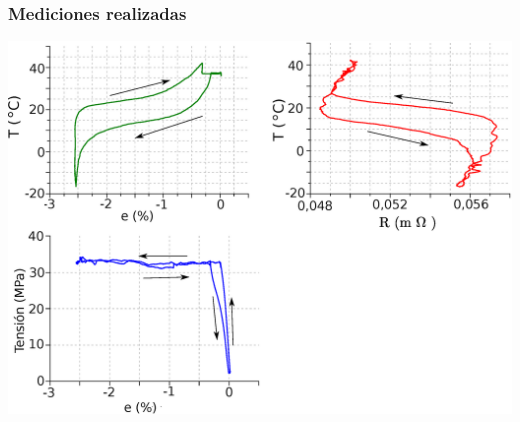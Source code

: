 \documentclass[usenames,dvipsnames]{beamer}
\begin{document}
% 
% 
% 
% 
% 
% 
% 
% 
%  
% 
% 
% 
% 
% 
% 
% 
% 
% 



\begin{frame}

\frametitle{Mediciones realizadas}
% 

\includegraphics[width=\textwidth]{img/resistencia/EjEnsayos.eps}

\end{frame}
\end{document}
